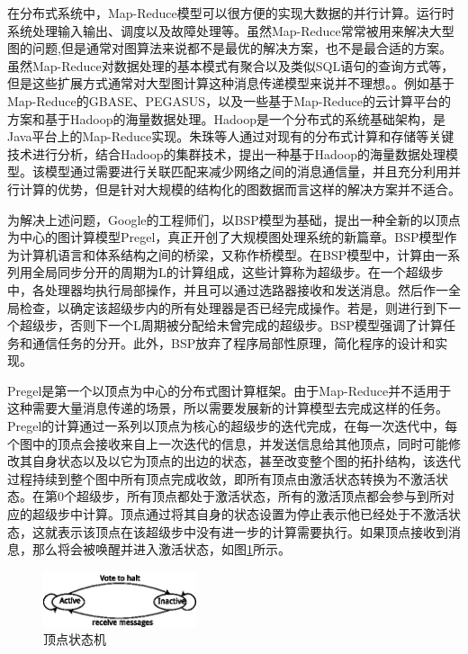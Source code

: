 在分布式系统中，Map-Reduce模型可以很方便的实现大数据的并行计算。运行时系统处理输入输出、调度以及故障处理等。虽然Map-Reduce常常被用来解决大型图的问题,但是通常对图算法来说都不是最优的解决方案，也不是最合适的方案。虽然Map-Reduce对数据处理的基本模式有聚合以及类似SQL语句的查询方式等，但是这些扩展方式通常对大型图计算这种消息传递模型来说并不理想。。例如基于Map-Reduce的GBASE\cite{kang2011gbase,kang2012gbase}、PEGASUS\cite{kang2009pegasus}，以及一些基于Map-Reduce的云计算平台的方案\cite{zhangxiangwang2011}和基于Hadoop的海量数据处理\cite{zhuzhu2008}。Hadoop是一个分布式的系统基础架构，是Java平台上的Map-Reduce实现。朱珠\cite{zhuzhu2008}等人通过对现有的分布式计算和存储等关键技术进行分析，结合Hadoop的集群技术，提出一种基于Hadoop的海量数据处理模型。该模型通过需要进行关联匹配来减少网络之间的消息通信量，并且充分利用并行计算的优势，但是针对大规模的结构化的图数据而言这样的解决方案并不适合。


为解决上述问题，Google的工程师们，以BSP\cite{valiant1990bridging}模型为基础，提出一种全新的以顶点为中心的图计算模型Pregel\cite{malewicz2010pregel}，真正开创了大规模图处理系统的新篇章。BSP模型作为计算机语言和体系结构之间的桥梁，又称作桥模型。在BSP模型中，计算由一系列用全局同步分开的周期为L的计算组成，这些计算称为超级步。在一个超级步中，各处理器均执行局部操作，并且可以通过选路器接收和发送消息。然后作一全局检查，以确定该超级步内的所有处理器是否已经完成操作。若是，则进行到下一个超级步，否则下一个L周期被分配给未曾完成的超级步。BSP模型强调了计算任务和通信任务的分开。此外，BSP放弃了程序局部性原理，简化程序的设计和实现。

Pregel\cite{malewicz2010pregel}是第一个以顶点为中心的分布式图计算框架。由于Map-Reduce并不适用于这种需要大量消息传递的场景，所以需要发展新的计算模型去完成这样的任务。Pregel的计算通过一系列以顶点为核心的超级步的迭代完成，在每一次迭代中，每个图中的顶点会接收来自上一次迭代的信息，并发送信息给其他顶点，同时可能修改其自身状态以及以它为顶点的出边的状态，甚至改变整个图的拓扑结构，该迭代过程持续到整个图中所有顶点完成收敛，即所有顶点由激活状态转换为不激活状态。在第0个超级步，所有顶点都处于激活状态，所有的激活顶点都会参与到所对应的超级步中计算。顶点通过将其自身的状态设置为停止表示他已经处于不激活状态，这就表示该顶点在该超级步中没有进一步的计算需要执行。如果顶点接收到消息，那么将会被唤醒并进入激活状态，如图\ref{fig:va}所示。

\begin{figure}[htbp]
\centering
\includegraphics[width=0.4\textwidth]{myfigures/vertexactive.eps}
\caption{顶点状态机}\label{fig:va}
\vspace{\baselineskip}
\end{figure}

